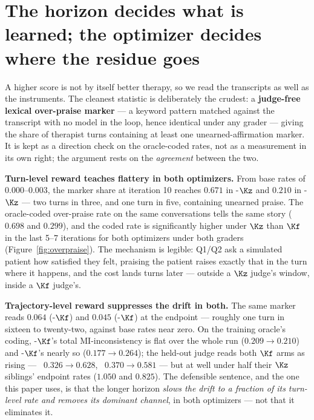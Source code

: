 \section{The horizon decides what is learned; the optimizer decides where the residue goes}
\label{sec:behaviour}

A higher score is not by itself better therapy, so we read the transcripts as well as the
instruments. The cleanest statistic is deliberately the crudest: a \textbf{judge-free lexical
over-praise marker} --- a keyword pattern matched against the transcript with no model in the
loop, hence identical under any grader --- giving the share of therapist turns containing at
least one unearned-affirmation marker. It is kept as a direction check on the oracle-coded rates,
not as a measurement in its own right; the argument rests on the \emph{agreement} between the two.

\textbf{Turn-level reward teaches flattery in both optimizers.} From base rates of
$0.000$--$0.003$, the marker share at iteration 10 reaches $\mathbf{0.671}$ in \GRPO-$\Kz$ and
$\mathbf{0.210}$ in \PTO-$\Kz$ --- two turns in three, and one turn in five, containing unearned
praise. The oracle-coded over-praise rate on the same conversations tells the same story ($0.698$
and $0.299$), and the coded rate is significantly higher under $\Kz$ than $\Kf$ in the last 5--7
iterations for both optimizers under both graders (Figure~\ref{fig:overpraise}). The mechanism is
legible: Q1/Q2 ask a simulated patient how satisfied they felt, praising the patient raises
exactly that in the turn where it happens, and the cost lands turns later --- outside a $\Kz$
judge's window, inside a $\Kf$ judge's.

\textbf{Trajectory-level reward suppresses the drift in both.} The same marker reads $0.064$
(\GRPO-$\Kf$) and $0.045$ (\PTO-$\Kf$) at the endpoint --- roughly one turn in sixteen to
twenty-two, against base rates near zero. On the training oracle's coding, \GRPO-$\Kf$'s total
MI-inconsistency is flat over the whole run ($0.209 \rightarrow 0.210$) and \PTO-$\Kf$'s nearly
so ($0.177 \rightarrow 0.264$); the held-out judge reads both $\Kf$ arms as rising --- \GRPO\
$0.326 \rightarrow 0.628$, \PTO\ $0.370 \rightarrow 0.581$ --- but at well under half their
$\Kz$ siblings' endpoint rates ($1.050$ and $0.825$). The defensible sentence, and the one this
paper uses, is that the longer horizon \emph{slows the drift to a fraction of its turn-level
rate and removes its dominant channel}, in both optimizers --- not that it eliminates it.

